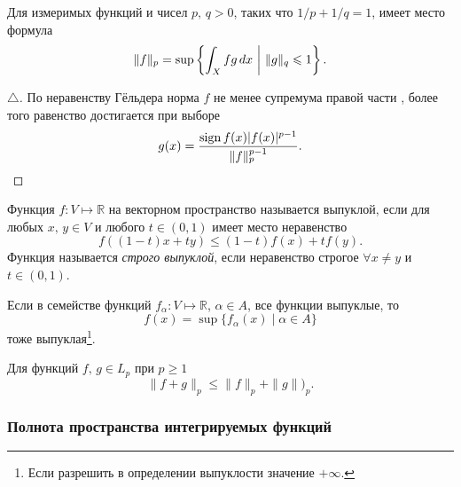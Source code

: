 \begin{to_con}
    Для измеримых функций и чисел $p, \, q > 0$, таких что $1/p + 1/q = 1$, имеет место формула
    \begin{equation}
        \label{8_1}
        \|f\|_p = \sup \left\{
            \int_X fg \, d x \ \bigg| \  \|g\|_q \leqslant 1
        \right\}.
    \end{equation}
\end{to_con}


\begin{proof}[$\triangle$]
По неравенству Гёльдера норма $f$ не менее супремума правой части , более того равенство достигается при выборе
\begin{equation*}
    g(x) = \frac{\mathop{\mathrm{sign}}\nolimits f(x) |f(x)|^{p-1}}{\|f\|_p^{p-1}}.
\end{equation*}
\end{proof}

\begin{to_def}
    Функция $f \colon V \mapsto \mathbb{R}$ на векторном пространство называется выпуклой, если для любых $x, \, y \in V$ и любого $t \in (0, 1)$ имеет место неравенство
    \begin{equation*}
        f ( (1-t) x + ty) \leq (1-t) f(x) + t f(y).
    \end{equation*}
    Функция называется \textit{строго выпуклой}, если неравенство строгое $\forall x \neq y$ и $t \in (0, 1)$. 
\end{to_def}

\begin{to_lem}
    Если в семействе функций $f_\alpha \colon V \mapsto \mathbb{R}$, $\alpha \in A$, все функции выпуклые, то
    \begin{equation*}
        f(x) = \sup \{f_\alpha (x) \mid \alpha \in A\}
    \end{equation*}
    тоже выпуклая\footnote{
        Если разрешить в определении выпуклости значение $+ \infty$.
    }.
\end{to_lem}


\begin{to_thr}
    Для функций $f, \, g \in L_p$ при $p \geq 1$
    \begin{equation*}
        \|f + g\|_p \leq \|f\|_p + \|g\|)_p.
    \end{equation*}
\end{to_thr}



\subsubsection*{Полнота пространства интегрируемых функций}

